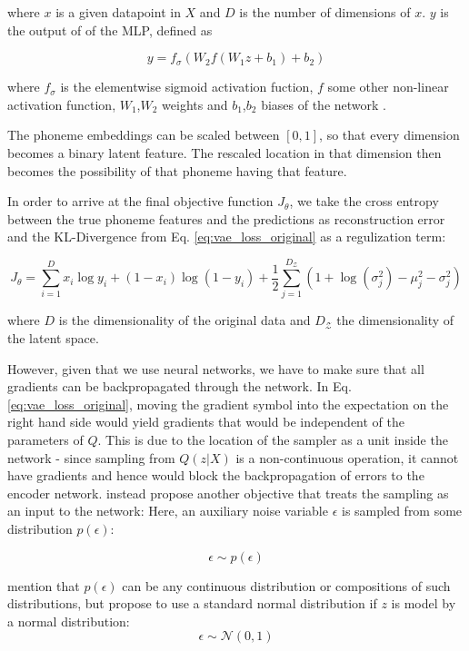 \documentclass[6pt]{article}
\begin{document}
where $x$ is a given datapoint in $X$ and $D$ is the number of dimensions of $x$. $y$ is the output of of the MLP, defined as 

\begin{equation}
y = f_\sigma (W_2 f(W_1 z + b_1 ) + b_2)
\end{equation}

where $f_\sigma$ is the elementwise sigmoid activation fuction, $f$ some other non-linear activation function, $W_1$,$W_2$ weights and $b_1$,$b_2$ biases of the network \citep[p. 11]{kingma2013auto}.

The phoneme embeddings  can be scaled between $[0,1]$, so that every dimension becomes a binary latent feature. The rescaled location in that dimension then becomes the possibility of that phoneme having that feature. 

In order to arrive at the final objective function $J_\theta$, we take the cross entropy between the true phoneme features and the predictions as reconstruction error and the KL-Divergence from Eq. \ref{eq:vae_loss_original} as a regulization term:

\begin{equation}
J_\theta = \sum_{i=1}^{D} x_i \log y_i + (1-x_i) \log (1-y_i) + \frac{1}{2}\sum_{j=1}^{D_{\mathcal{Z}}}(1+\log(\sigma_j^2)-\mu_j^2-\sigma_j^2)
\end{equation}

where $D$ is the dimensionality of the original data and $D_{\mathcal{Z}}$ the dimensionality of the latent space.

However, given that we use neural networks, we have to make sure that all gradients can be backpropagated through the network. In Eq. \ref{eq:vae_loss_original}, moving the gradient symbol into the expectation on the right hand side would yield gradients that would be independent of the parameters of $Q$. This is due to the location of the sampler as a unit inside the network - since sampling from $Q(z|X)$ is a non-continuous operation, it cannot have gradients and hence would block the backpropagation of errors to the encoder network. \cite{kingma2013auto} instead propose another objective that treats the sampling as an input to the network: Here, an auxiliary noise variable $\epsilon$ is sampled from some distribution $p(\epsilon)$:

\begin{equation}
\epsilon \sim p(\epsilon)
\end{equation}

\cite{kingma2013auto} mention that  $p(\epsilon)$ can be any continuous distribution or compositions of such distributions, but propose to use a standard normal distribution if $z$ is model by a normal distribution:
\begin{equation}
\epsilon \sim \mathcal{N}(0,1)
\end{equation}
\end{document}
